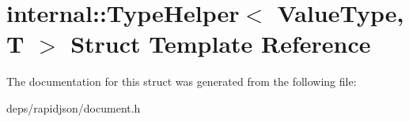 \hypertarget{structinternal_1_1_type_helper}{}\section{internal\+:\+:Type\+Helper$<$ Value\+Type, T $>$ Struct Template Reference}
\label{structinternal_1_1_type_helper}


The documentation for this struct was generated from the following file\+:\begin{DoxyCompactItemize}
\item 
deps/rapidjson/document.\+h\end{DoxyCompactItemize}
